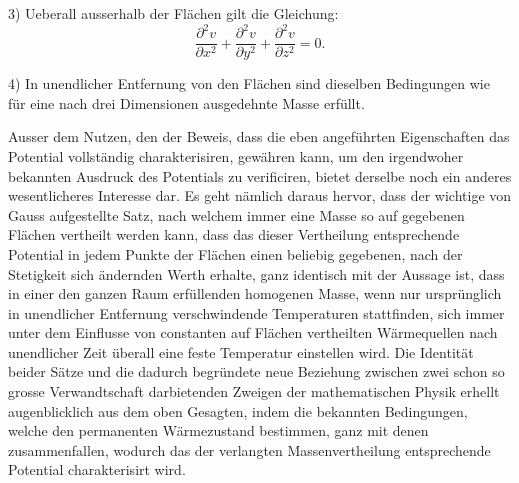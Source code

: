 \documentclass[11pt]{article}
\begin{document}
3) Ueberall ausserhalb der Flächen gilt die Gleichung:
\[
\frac{\partial^2 v}{\partial x^2}+\frac{\partial^2 v}{\partial y^2}+\frac{\partial^2 v}{\partial z^2}=0.
\]

4) In unendlicher Entfernung von den Flächen sind dieselben Bedingungen wie für eine nach drei Dimensionen ausgedehnte Masse erfüllt.

Ausser dem Nutzen, den der Beweis, dass die eben angeführten Eigenschaften das Potential vollständig charakterisiren, gewähren kann, um den irgendwoher bekannten Ausdruck des Potentials zu verificiren, bietet derselbe noch ein anderes wesentlicheres Interesse dar. Es geht nämlich daraus hervor, dass der wichtige von Gauss aufgestellte Satz, nach welchem immer eine Masse so auf gegebenen Flächen vertheilt werden kann, dass das dieser Vertheilung entsprechende Potential in jedem Punkte der Flächen einen beliebig gegebenen, nach der Stetigkeit sich ändernden Werth erhalte, ganz identisch mit der Aussage ist, dass in einer den ganzen Raum erfüllenden homogenen Masse, wenn nur ursprünglich in unendlicher Entfernung verschwindende Temperaturen stattfinden, sich immer unter dem Einflusse von constanten auf Flächen vertheilten Wärmequellen nach unendlicher Zeit überall eine feste Temperatur einstellen wird. Die Identität beider Sätze und die dadurch begründete neue Beziehung zwischen zwei schon so grosse Verwandtschaft darbietenden Zweigen der mathematischen Physik erhellt augenblicklich aus dem oben Gesagten, indem die bekannten Bedingungen, welche den permanenten Wärmezustand bestimmen, ganz mit denen zusammenfallen, wodurch das der verlangten Massenvertheilung entsprechende Potential charakterisirt wird.
\end{document}
